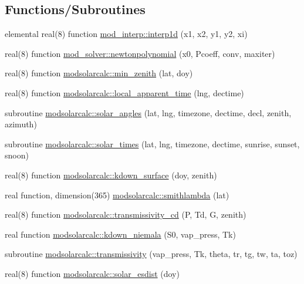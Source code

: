 \subsection*{Functions/\+Subroutines}
\begin{DoxyCompactItemize}
\item 
elemental real(8) function \hyperlink{namespacemod__interp_aa2652ff1ded2f432b31108bd81c6dbd6}{mod\+\_\+interp\+::interp1d} (x1, x2, y1, y2, xi)
\item 
real(8) function \hyperlink{namespacemod__solver_a7906d5a56feebc123a09f0898a0a54e5}{mod\+\_\+solver\+::newtonpolynomial} (x0, Pcoeff, conv, maxiter)
\item 
real(8) function \hyperlink{namespacemodsolarcalc_adfed66792e245bded2293250a0436520}{modsolarcalc\+::min\+\_\+zenith} (lat, doy)
\item 
real(8) function \hyperlink{namespacemodsolarcalc_a9ea53ee8fa5b7be8f0e7d919cc846182}{modsolarcalc\+::local\+\_\+apparent\+\_\+time} (lng, dectime)
\item 
subroutine \hyperlink{namespacemodsolarcalc_a6f49f02608586154b6a3b3cddcd6aa5e}{modsolarcalc\+::solar\+\_\+angles} (lat, lng, timezone, dectime, decl, zenith, azimuth)
\item 
subroutine \hyperlink{namespacemodsolarcalc_a2fbd1d33b3bd03fd930a2a3d93b83599}{modsolarcalc\+::solar\+\_\+times} (lat, lng, timezone, dectime, sunrise, sunset, snoon)
\item 
real(8) function \hyperlink{namespacemodsolarcalc_af8c3c752c506d880efae84070a189a71}{modsolarcalc\+::kdown\+\_\+surface} (doy, zenith)
\item 
real function, dimension(365) \hyperlink{namespacemodsolarcalc_abf0aac3f480ad1b6dbfdac598c453fa5}{modsolarcalc\+::smithlambda} (lat)
\item 
real(8) function \hyperlink{namespacemodsolarcalc_ad567772df0c379c013b1bec090be214a}{modsolarcalc\+::transmissivity\+\_\+cd} (P, Td, G, zenith)
\item 
real function \hyperlink{namespacemodsolarcalc_aaddec454c9882fef35b57ee1fa6206b2}{modsolarcalc\+::kdown\+\_\+niemala} (S0, vap\+\_\+press, Tk)
\item 
subroutine \hyperlink{namespacemodsolarcalc_a8e5e61f1a3537693aa4ca5527f74233e}{modsolarcalc\+::transmissivity} (vap\+\_\+press, Tk, theta, tr, tg, tw, ta, toz)
\item 
real(8) function \hyperlink{namespacemodsolarcalc_a17e233516e1b3514fd9d46a9ebe44e5e}{modsolarcalc\+::solar\+\_\+esdist} (doy)
\item 

\end{DoxyCompactItemize}
